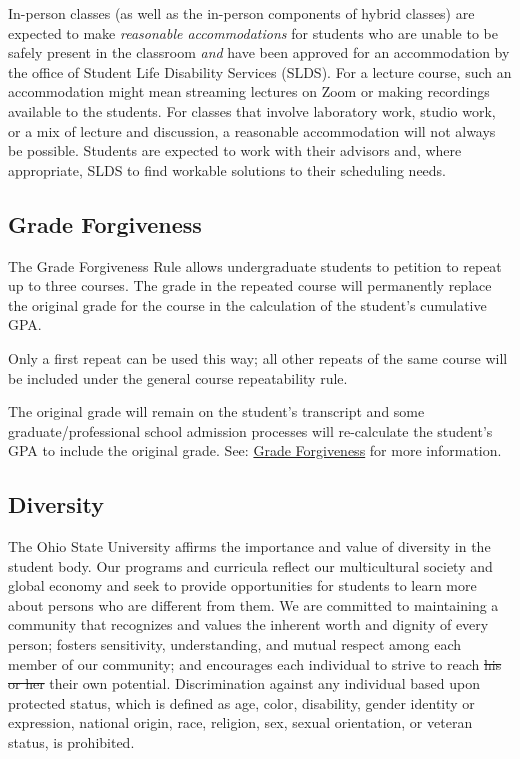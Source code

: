 \documentclass[12pt,letter,english]{report}
\begin{document}
In-person classes (as well as the in-person components of hybrid classes) are expected to make \emph{reasonable accommodations} for students who are unable to be safely present in the classroom \emph{and} have been approved for an accommodation by the office of Student Life Disability Services (SLDS). For a lecture course, such an accommodation might mean streaming lectures on Zoom or making recordings available to the students. For classes that involve laboratory work, studio work, or a mix of lecture and discussion, a reasonable accommodation will not always be possible. Students are expected to work with their advisors and, where appropriate, SLDS to find workable solutions to their scheduling needs.

\subsection{Grade Forgiveness}

The Grade Forgiveness Rule allows undergraduate students to petition to repeat up to three courses. The grade in the repeated course will permanently replace the original grade for the course in the calculation of the student's cumulative GPA.

Only a first repeat can be used this way; all other repeats of the same course will be included under the general course repeatability rule.

The original grade will remain on the student's transcript and some graduate/professional school admission processes will re-calculate the student's GPA to include the original grade. See: \href{https://advising.osu.edu/grade-forgiveness-0}{Grade Forgiveness} for more information.

\subsection{Diversity}

The Ohio State University affirms the importance and value of diversity in the student body. Our programs and curricula reflect our multicultural society and global economy and seek to provide opportunities for students to learn more about persons who are different from them. We are committed to maintaining a community that recognizes and values the inherent worth and dignity of every person; fosters sensitivity, understanding, and mutual respect among each member of our community; and encourages each individual to strive to reach \sout{his or her} their own potential. Discrimination against any individual based upon protected status, which is defined as age, color, disability, gender identity or expression, national origin, race, religion, sex, sexual orientation, or veteran status, is prohibited.
\end{document}
